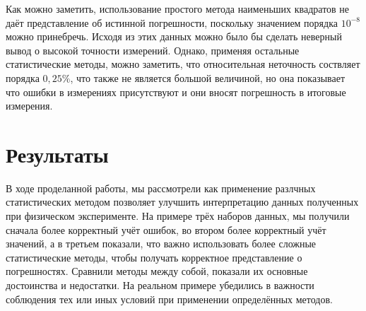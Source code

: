 \documentclass[a4paper,20pt]{article}
\theoremstyle{definition}
\begin{document}
Как можно заметить, использование простого метода наименьших квадратов не даёт представление об истинной погрешности, поскольку 
значением порядка $10^{-8}$ можно принебречь. Исходя из этих данных можно было бы сделать неверный вывод о высокой точности измерений. 
Однако, применяя остальные статистические методы, можно заметить, что относительная неточность соствляет порядка $0,25 \%$, что также не является большой величиной,
но она показывает что ошибки в измерениях присутствуют и они вносят погрешность в итоговые измерения.



\section{Результаты}
В ходе проделанной работы, мы рассмотрели как применение разлчных статистических методом позволяет улучшить интерпретацию данных полученных при физическом эксперименте.
На примере трёх наборов данных, мы получили сначала более корректный учёт ошибок, во втором более корректный учёт значений, а в третьем показали, что важно использовать более сложные статистические методы, чтобы получать корректное представление о погрешностях.
Сравнили методы между собой, показали их основные достоинства и недостатки. На реальном примере убедились в важности соблюдения тех или иных условий при применении определённых
методов.
\end{document}
